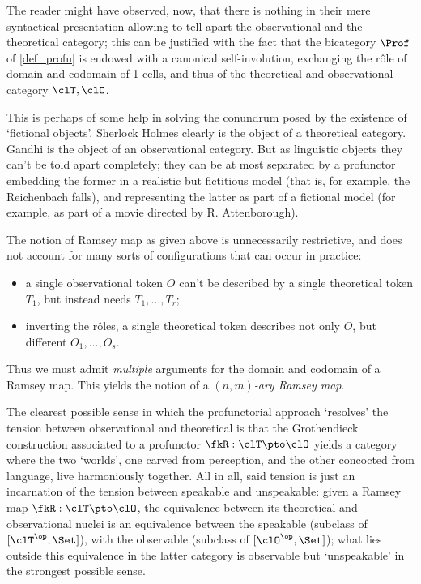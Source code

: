 \begin{remark}
	The reader might have observed, now, that there is nothing in their mere syntactical presentation allowing to tell apart the observational and the theoretical category; this can be justified with the fact that the bicategory $\Prof$ of \autoref{def_profu} is endowed with a canonical self-involution, exchanging the r\^ole of domain and codomain of 1-cells, and thus of the theoretical and observational category $\clT,\clO$.
	
	This is perhaps of some help in solving the conundrum posed by the existence of `fictional objects'. Sherlock Holmes clearly is the object of a theoretical category. Gandhi is the object of an observational category. But as linguistic objects they can't be told apart completely; they can be at most separated by a profunctor embedding the former in a realistic but fictitious model (that is, for example, the Reichenbach falls), and representing the latter as part of a fictional model (for example, as part of a movie directed by R. Attenborough).
\end{remark}
\begin{remark}\label{multiramsey}
	The notion of Ramsey map as given above is unnecessarily restrictive, and does not account for many sorts of configurations that can occur in practice:
	\begin{itemize}
		\item a single observational token $O$ can't be described by a single theoretical token $T_1$, but instead needs $T_1,\dots,T_r$;
		\item inverting the r\^oles, a single theoretical token describes not only $O$, but different $O_1,\dots,O_s$.
	\end{itemize}
	Thus we must admit \emph{multiple} arguments for the domain and codomain of a Ramsey map. This yields the notion of a \emph{$(n,m)$-ary Ramsey map}.
\end{remark}
\begin{remark}\label{resoudre_la_tension}
	The clearest possible sense in which the profunctorial approach `resolves' the tension between observational and theoretical is that the Gro\-then\-dieck construction associated to a profunctor $\fkR : \clT \pto \clO$ yields a category where the two `worlds', one carved from perception, and the other concocted from language, live harmoniously together. All in all, said tension is just an incarnation of the tension between speakable and unspeakable: given a Ramsey map $\fkR : \clT \pto \clO$, the equivalence between its theoretical and observational nuclei is an equivalence between the speakable (subclass of $[\clT^\op,\Set]$), with the observable (subclass of $[\clO^\op,\Set]$); what lies outside this equivalence in the latter category is observable but `unspeakable' in the strongest possible sense.
\end{remark}
